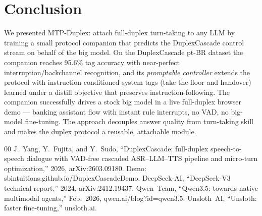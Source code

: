 \documentclass[conference]{IEEEtran}
\begin{document}
\section{Conclusion}
We presented MTP-Duplex: attach full-duplex turn-taking to any LLM by
training a small protocol companion that predicts the DuplexCascade control
stream on behalf of the big model. On the DuplexCascade pt-BR dataset the
companion reaches 95.6\% tag accuracy with near-perfect
interruption/backchannel recognition, and its \emph{promptable controller}
extends the protocol with instruction-conditioned system tags
(take-the-floor and handover) learned under a distill objective that
preserves instruction-following. The companion successfully drives a stock
big model in a live full-duplex browser demo — banking assistant flow with
instant rule interrupts, no VAD, no big-model fine-tuning. The approach
decouples answer quality from turn-taking skill and makes the duplex
protocol a reusable, attachable module.

\begin{thebibliography}{00}
J.~Yang, Y.~Fujita, and Y.~Sudo, ``DuplexCascade: full-duplex speech-to-speech
dialogue with VAD-free cascaded ASR--LLM--TTS pipeline and micro-turn
optimization,'' 2026, arXiv:2603.09180. Demo: sbintuitions.github.io/DuplexCascadeDemo.
DeepSeek-AI, ``DeepSeek-V3 technical report,'' 2024, arXiv:2412.19437.
Qwen~Team, ``Qwen3.5: towards native multimodal agents,'' Feb.~2026,
qwen.ai/blog?id=qwen3.5.
Unsloth~AI, ``Unsloth: faster fine-tuning,'' unsloth.ai.
\end{thebibliography}
\end{document}
